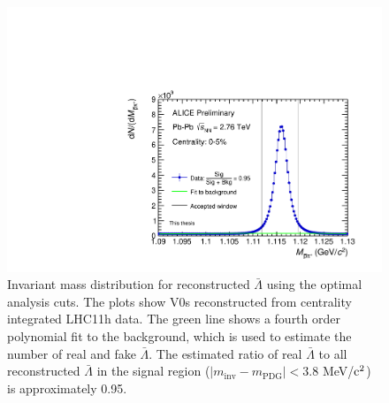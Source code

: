\begin{figure}[hbtp]
\includegraphics[width=36pc]{Figures/2014-05-11-ALamMinv-CommentCorrections.pdf}
\caption[$\bar{\Lambda}$ invariant mass distributions]{Invariant mass distribution for reconstructed $\bar{\Lambda}$ using the optimal analysis cuts.  The plots show V0s reconstructed from centrality integrated LHC11h data.  The green line shows a fourth order polynomial fit to the background, which is used to estimate the number of real and fake $\bar{\Lambda}$.  The estimated ratio of real $\bar{\Lambda}$ to all reconstructed $\bar{\Lambda}$ in the signal region ($ \lvert m_{\mathrm{inv}} - m_{\mathrm{PDG}}\rvert < 3.8$ MeV/$\rm c^2$) is approximately 0.95.}
\label{fig:AppendixALamInvMass}
\end{figure}


